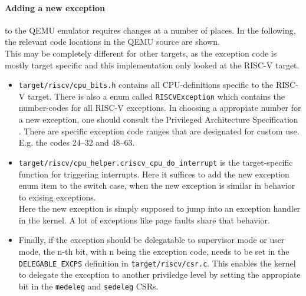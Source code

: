 

\paragraph{Adding a new exception}to the QEMU emulator requires changes at a number of places. In the following,
the relevant code locations in the QEMU source are shown.\\
This may be completely different for other targets, as the exception code is mostly target specific and
this implementation only looked at the RISC-V target.
\begin{itemize}
    \item \texttt{target/riscv/cpu\_bits.h} contains all CPU-definitions specific to the RISC-V target.
          There is also a enum called \texttt{RISCVException} which contains the number-codes for all RISC-V exceptions.
          In choosing a appropiate number for a new exception, one should consult the Privileged Architecture Specification \cite{RISCVInstructionSet}.
          There are specific exception code ranges that are designated for custom use. E.g. the codes 24--32 and 48--63.
    \item \texttt{target/riscv/cpu\_helper.c\:riscv\_cpu\_do\_interrupt\(\)} is the target-specific function
          for triggering interrupts. Here it suffices to add the new exception enum item to the switch case, when
          the new exception is similar in behavior to exising exceptions.\\
          Here the new exception is simply supposed to jump into an exception handler in the kernel. A lot of exceptions
          like page faults share that behavior.
    \item Finally, if the exception should be delegatable to supervisor mode or user mode, the n-th bit,
          with n being the exception code, needs to be set in the \texttt{DELEGABLE\_EXCPS} definition in \texttt{target/riscv/csr.c}.
          This enables the kernel to delegate the exception to another priviledge level by setting the appropiate
          bit in the \texttt{medeleg} and \texttt{sedeleg} CSRs.
\end{itemize}



